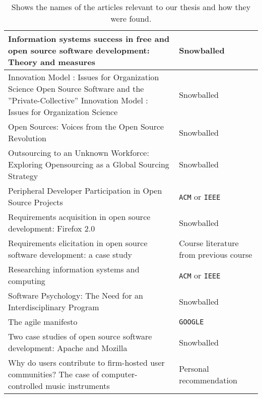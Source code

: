\documentclass[11pt, oneside]{article}   	%
\begin{document}
\begin{table}[!h]
\begin{tabular}{  p{}  p{} }
		Information systems success in free and open source software development: Theory and measures	& Snowballed	\\\hline
		Innovation Model : Issues for Organization Science Open Source Software and the ''Private-Collective'' Innovation Model : Issues for Organization Science	& Snowballed	\\\hline
		Open Sources: Voices from the Open Source Revolution	& Snowballed	\\\hline
		Outsourcing to an Unknown Workforce: Exploring Opensourcing as a Global Sourcing Strategy	& Snowballed	\\\hline
		Peripheral Developer Participation in Open Source Projects	& \texttt{ACM} or \texttt{IEEE}	\\\hline
		Requirements acquisition in open source development: Firefox 2.0	& Snowballed	\\\hline
		Requirements elicitation in open source software development: a case study	& Course literature from previous course	\\\hline
		Researching information systems and computing	& \texttt{ACM} or \texttt{IEEE}	\\\hline
		Software Psychology: The Need for an Interdisciplinary Program	& Snowballed	\\\hline
		The agile manifesto	& \texttt{GOOGLE}	\\\hline
		Two case studies of open source software development: Apache and Mozilla	& Snowballed	\\\hline
		Why do users contribute to firm-hosted user communities? The case of computer-controlled music instruments	& Personal recommendation	\\\hline
	\end{tabular}
	\caption{Shows the names of the articles relevant to our thesis and how they were found.}
	\label{tab:relevant}
\end{table}
\end{document}
